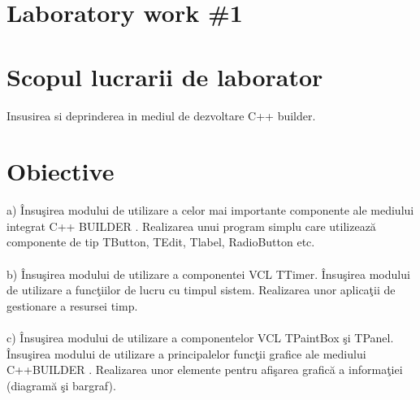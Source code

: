 \section*{Laboratory work \#1}

\section{Scopul lucrarii de laborator}

Insusirea si deprinderea in mediul de dezvoltare C++ builder.

\section{Obiective}

a) Însuşirea modului de utilizare a celor mai importante componente ale mediului integrat C++ BUILDER . Realizarea unui program simplu care utilizează componente de tip TButton, TEdit, Tlabel, RadioButton  etc.  
\\\\b) Însuşirea modului de utilizare a componentei VCL TTimer. Însuşirea modului de utilizare a funcţiilor de lucru cu timpul sistem. Realizarea unor aplicaţii de gestionare a resursei timp. 
\\\\c) Însuşirea modului de utilizare a componentelor VCL  TPaintBox şi TPanel. Însuşirea modului de utilizare a principalelor funcţii grafice ale mediului C++BUILDER . Realizarea unor elemente pentru  afişarea grafică a informaţiei (diagramă şi bargraf).  

\clearpage